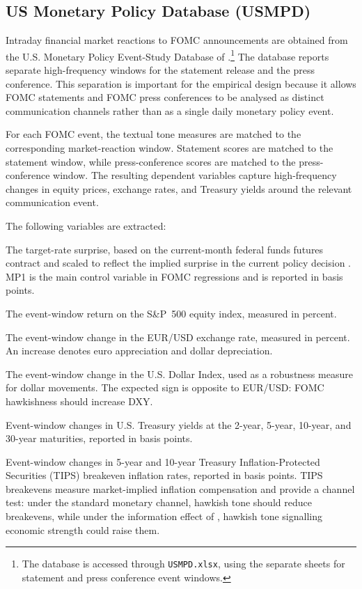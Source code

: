 \subsection{US Monetary Policy Database (USMPD)}
\label{sec:data_usmpd}

Intraday financial market reactions to FOMC announcements are obtained
from the U.S. Monetary Policy Event-Study Database of
\citet{acosta2025}.\footnote{The database is accessed through
\texttt{USMPD.xlsx}, using the separate sheets for statement and press
conference event windows.} The database reports separate high-frequency
windows for the statement release and the press conference. This
separation is important for the empirical design because it allows FOMC
statements and FOMC press conferences to be analysed as distinct
communication channels rather than as a single daily monetary policy
event.

For each FOMC event, the textual tone measures are matched to the
corresponding market-reaction window. Statement scores are matched to the
statement window, while press-conference scores are matched to the
press-conference window. The resulting dependent variables capture
high-frequency changes in equity prices, exchange rates, and Treasury
yields around the relevant communication event.

The following variables are extracted:
 
\begin{description}[noitemsep, leftmargin=2.7cm, font=\normalfont\bfseries]
  \item[MP1] The target-rate surprise, based on the current-month
    federal funds futures contract and scaled to reflect the implied
    surprise in the current policy decision \citep{kuttner2001}. MP1
    is the main control variable in FOMC regressions and is reported
    in basis points.
  \item[S\&P~500] The event-window return on the S\&P~500 equity
    index, measured in percent.
  \item[EUR/USD] The event-window change in the EUR/USD exchange
    rate, measured in percent. An increase denotes euro appreciation
    and dollar depreciation.
  \item[DXY] The event-window change in the U.S. Dollar Index, used
    as a robustness measure for dollar movements. The expected sign
    is opposite to EUR/USD: FOMC hawkishness should increase DXY.
  \item[UST~2Y, 5Y, 10Y, 30Y] Event-window changes in U.S.
    Treasury yields at the 2-year, 5-year, 10-year, and 30-year
    maturities, reported in basis points.
  \item[TIPS~5Y, TIPS~10Y] Event-window changes in 5-year and
    10-year Treasury Inflation-Protected Securities (TIPS)
    breakeven inflation rates, reported in basis points. TIPS
    breakevens measure market-implied inflation compensation and
    provide a channel test: under the standard monetary channel,
    hawkish tone should reduce breakevens, while under the
    information effect of \citet{nakamura2018}, hawkish tone
    signalling economic strength could raise them.
\end{description}

